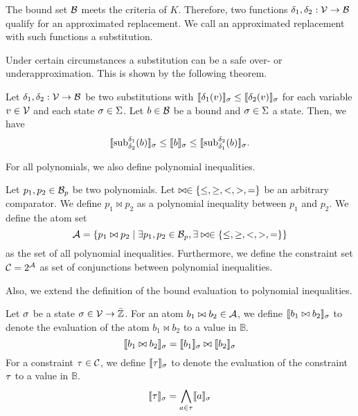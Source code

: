 The bound set $\mathcal{B}$ meets the criteria of $K$.
Therefore, two functions $\delta_1, \delta_2: \mathcal{V} \rightarrow \mathcal{B}$ qualify for an approximated replacement.
We call an approximated replacement with such functions a substitution.


Under certain circumstances a substitution can be a safe over- or underapproximation.
This is shown by the following theorem.


\begin{theorem}
  Let $\delta_1, \delta_2: \mathcal{V} \rightarrow \mathcal{B}$ be two substitutions with $\llbracket \delta_1(v) \rrbracket_{\sigma} \leq \llbracket \delta_2(v) \rrbracket_{\sigma}$ for each variable $v \in \mathcal{V}$ and each state $\sigma \in \Sigma$.
  Let $b \in \mathcal{B}$ be a bound and $\sigma \in \Sigma$ a state.
  Then, we have
  \[ \llbracket \text{sub}_{\delta_2}^{\delta_1}(b) \rrbracket_{\sigma} \leq \llbracket b \rrbracket_{\sigma} \leq \llbracket \text{sub}_{\delta_1}^{\delta_2}(b) \rrbracket_{\sigma}. \]
\end{theorem}
For all polynomials, we also define polynomial inequalities.

\begin{definition}
  Let $p_1, p_2 \in \mathcal{B}_p$ be two polynomials.
  Let $\bowtie \in \lbrace \leq, \geq, <, >, = \rbrace$ be an arbitrary comparator.
  We define $p_1 \bowtie p_2$ as a polynomial inequality between $p_1$ and $p_2$.
  We define the atom set
  \[ \mathcal{A} = \lbrace p_1 \bowtie p_2 \mid \exists p_1, p_2 \in \mathcal{B}_p, \exists \bowtie \in \lbrace \leq, \geq, <, >, = \rbrace \rbrace \]
  as the set of all polynomial inequalities.
  Furthermore, we define the constraint set $\mathcal{C} = 2^{\mathcal{A}}$ as set of conjunctions between polynomial inequalities.
\end{definition}
Also, we extend the definition of the bound evaluation to polynomial inequalities.

\begin{definition}
  Let $\sigma$ be a state $\sigma \in \mathcal{V} \rightarrow \bar{\mathbb{Z}}$.
  For an atom $b_1 \bowtie b_2 \in \mathcal{A}$, we define $\llbracket b_1 \bowtie b_2 \rrbracket_{\sigma}$ to denote the evaluation of the atom $b_1 \bowtie b_2$ to a value in $\mathbb{B}$.
  \[ \llbracket b_1 \bowtie b_2 \rrbracket_{\sigma} = \llbracket b_1 \rrbracket_{\sigma} \bowtie \llbracket b_2 \rrbracket_{\sigma} \]
  For a constraint $\tau \in \mathcal{C}$, we define $\llbracket \tau \rrbracket_{\sigma}$ to denote the evaluation of the constraint $\tau$ to a value in $\mathbb{B}$.
  \[ \llbracket \tau \rrbracket_{\sigma} = \bigwedge_{a \in \tau} \llbracket a \rrbracket_{\sigma} \]
\end{definition}
